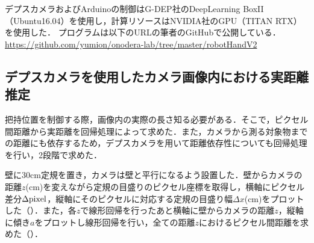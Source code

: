 デプスカメラおよびArduinoの制御はG-DEP社のDeepLearning BoxII（Ubuntu16.04）を使用し，計算リソースはNVIDIA社のGPU（TITAN RTX）を使用した．
プログラムは以下のURLの筆者のGitHubで公開している．
\url{https://github.com/yumion/onodera-lab/tree/master/robotHandV2}


\subsection{デプスカメラを使用したカメラ画像内における実距離推定}
把持位置を制御する際，画像内の実際の長さ知る必要がある．そこで，ピクセル間距離から実距離を回帰処理によって求めた．また，カメラから測る対象物までの距離にも依存するため，デプスカメラを用いて距離依存性についても回帰処理を行い，2段階で求めた．

壁に30cm定規を置き，カメラは壁と平行になるよう設置した．壁からカメラの距離$z$(cm)を変えながら定規の目盛りのピクセル座標を取得し，横軸にピクセル差分$\Delta \rm{pixel}$，縦軸にそのピクセルに対応する定規の目盛り幅$\Delta x$(cm)をプロットした（）．また，各$z$で線形回帰を行ったあと横軸に壁からカメラの距離$z$，縦軸に傾き$a$をプロットし線形回帰を行い，全ての距離$z$におけるピクセル間距離を求めた（）．


